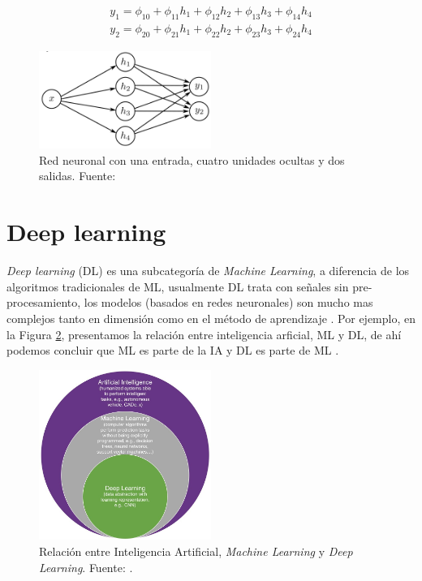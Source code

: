 \begin{equation}\label{equa:ml_2}	
	\begin{split}
		y_1 = \phi_{10} + \phi_{11}h_1  + \phi_{12}h_2 + \phi_{13}h_3 + \phi_{14}h_4 \\
		y_2 = \phi_{20} + \phi_{21}h_1  + \phi_{22}h_2 + \phi_{23}h_3 + \phi_{24}h_4
	\end{split}
\end{equation}	

\begin{figure}[H]
	\centering
	\includegraphics[width=0.5\textwidth]{../img/theory/shallow}
	\caption{Red neuronal con una entrada, cuatro unidades ocultas y dos salidas. Fuente: \cite{prince2023understanding} }
	\label{fig:shallow}
\end{figure}

\section{Deep learning}

\textit{Deep learning} (DL) es una subcategoría de \textit{Machine Learning}, a diferencia de los algoritmos tradicionales de ML, usualmente DL trata con señales sin pre-procesamiento, los modelos (basados en redes neuronales) son mucho mas complejos tanto en dimensión como en el método de aprendizaje \citep{el2022machine}. Por ejemplo, en la Figura \ref{fig:dl}, presentamos la relación entre inteligencia arficial, ML y DL, de ahí podemos concluir que ML es parte de la IA y DL es parte de ML \citep{el2022machine}.

\begin{figure}[H]
	\centering
	\includegraphics[width=0.5\textwidth]{../img/neoantigen/dl}
	\caption{Relación entre Inteligencia Artificial, \textit{Machine Learning} y \textit{Deep Learning}. Fuente: \cite{el2022machine}.}
	\label{fig:dl}
\end{figure}

